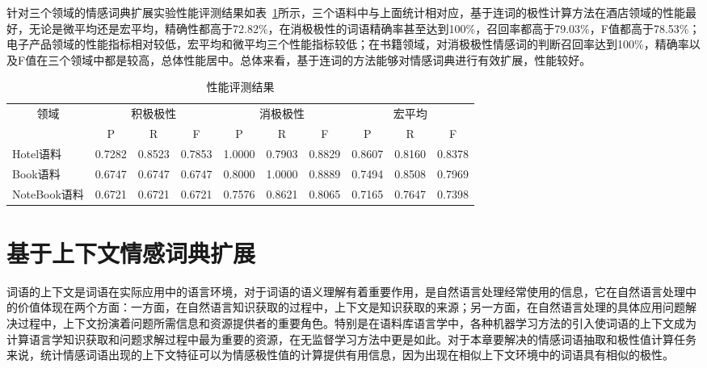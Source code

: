 针对三个领域的情感词典扩展实验性能评测结果如表~\ref{tab3-3}所示，三个语料中与上面统计相对应，基于连词的极性计算方法在酒店领域的性能最好，无论是微平均还是宏平均，精确性都高于72.82\%，在消极极性的词语精确率甚至达到100\%，召回率都高于79.03\%，F值都高于78.53\%；电子产品领域的性能指标相对较低，宏平均和微平均三个性能指标较低；在书籍领域，对消极极性情感词的判断召回率达到100\%，精确率以及F值在三个领域中都是较高，总体性能居中。总体来看，基于连词的方法能够对情感词典进行有效扩展，性能较好。
\begin{table}[htp]
\centering
\caption{性能评测结果}
\label{tab3-3}
\begin{tabular}{|l|l|l|l|l|l|l|l|l|l|}
\hline
\multicolumn{1}{|c|}{\multirow{2}{*}{领域}} & \multicolumn{3}{c|}{积极极性} & \multicolumn{3}{c|}{消极极性} & \multicolumn{3}{c|}{宏平均} \\ \cline{2-10} 
\multicolumn{1}{|c|}{} & \multicolumn{1}{c|}{P} & \multicolumn{1}{c|}{R} & \multicolumn{1}{c|}{F} & \multicolumn{1}{c|}{P} & \multicolumn{1}{c|}{R} & \multicolumn{1}{c|}{F} & \multicolumn{1}{c|}{P} & \multicolumn{1}{c|}{R} & \multicolumn{1}{c|}{F} \\ \hline
Hotel语料 & 0.7282 & 0.8523 & 0.7853 & 1.0000 & 0.7903 & 0.8829 & 0.8607 & 0.8160 & 0.8378 \\ \hline
Book语料 & 0.6747 & 0.6747 & 0.6747 & 0.8000 & 1.0000 & 0.8889 & 0.7494 & 0.8508 & 0.7969 \\ \hline
NoteBook语料 & 0.6721 & 0.6721 & 0.6721 & 0.7576 & 0.8621 & 0.8065 & 0.7165 & 0.7647 & 0.7398 \\ \hline
\end{tabular}
\end{table}

\section{基于上下文情感词典扩展}
词语的上下文是词语在实际应用中的语言环境，对于词语的语义理解有着重要作用，是自然语言处理经常使用的信息，它在自然语言处理中的价值体现在两个方面：一方面，在自然语言知识获取的过程中，上下文是知识获取的来源；另一方面，在自然语言处理的具体应用问题解决过程中，上下文扮演着问题所需信息和资源提供者的重要角色。特别是在语料库语言学中，各种机器学习方法的引入使词语的上下文成为计算语言学知识获取和问题求解过程中最为重要的资源，在无监督学习方法中更是如此。对于本章要解决的情感词语抽取和极性值计算任务来说，统计情感词语出现的上下文特征可以为情感极性值的计算提供有用信息，因为出现在相似上下文环境中的词语具有相似的极性。

